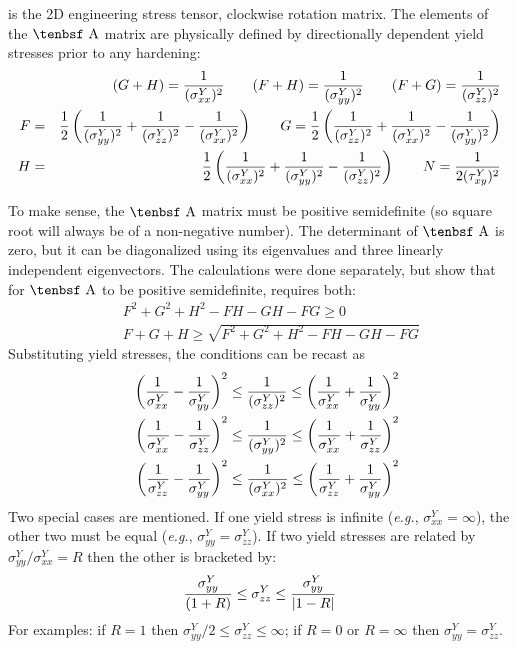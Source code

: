 \documentclass[11pt]{article}
\def\A{\hbox{\tenbsf A}}
\def\s#1{\sigma_{#1}}
\def\t#1{\tau_{#1}}
\begin{document}
is the 2D engineering stress tensor, clockwise rotation matrix. The elements of the $\A$ matrix are physically defined by directionally dependent yield stresses prior to any hardening:
\begin{eqnarray}
       &&(G+H)  =  {1\over (\s{xx}^Y)^2}   \qquad
       (F+H)  =  {1\over (\s{yy}^Y)^2}  \qquad
       (F+G)  =  {1\over (\s{zz}^Y)^2} \\
        F & = & {1\over 2}\left( {1\over (\s{yy}^Y)^2} + {1\over (\s{zz}^Y)^2} - {1\over (\s{xx}^Y)^2}\right) \qquad
       G = {1\over 2}\left( {1\over (\s{zz}^Y)^2} + {1\over (\s{xx}^Y)^2} - {1\over (\s{yy}^Y)^2}\right) \\
       H & = & {1\over 2}\left( {1\over (\s{xx}^Y)^2} + {1\over (\s{yy}^Y)^2} - {1\over (\s{zz}^Y)^2}\right) \qquad
       N = {1\over 2(\t{xy}^Y)^2}
\end{eqnarray}

To make sense, the $\A$ matrix must be positive semidefinite (so square root will always be of a non-negative number). The determinant of $\A$ is zero, but it can be diagonalized using its eigenvalues and three linearly independent eigenvectors. The calculations were done separately, but show that for $\A$ to be positive semidefinite, requires both:
\begin{eqnarray}
        &&F^2+G^2+H^2-FH-GH-FG \ge 0 \\
        &&F+G+H \ge \sqrt{F^2+G^2+H^2-FH-GH-FG}
\end{eqnarray}
Substituting yield stresses, the conditions can be recast as
\begin{eqnarray}
    && \left({1\over \s{xx}^Y}- {1\over \s{yy}^Y}\right)^2 \le {1\over (\s{zz}^Y)^2} \le \left({1\over \s{xx}^Y}+ {1\over \s{yy}^Y}\right)^2 \\
    && \left({1\over \s{xx}^Y}- {1\over \s{zz}^Y}\right)^2 \le {1\over (\s{yy}^Y)^2} \le \left({1\over \s{xx}^Y}+ {1\over \s{zz}^Y}\right)^2 \\
    && \left({1\over \s{zz}^Y}- {1\over \s{yy}^Y}\right)^2 \le {1\over (\s{xx}^Y)^2} \le \left({1\over \s{zz}^Y}+ {1\over \s{yy}^Y}\right)^2 
\end{eqnarray}
Two special cases are mentioned. If one yield stress is infinite ({\em e.g.}, $\s{xx}^Y=\infty$), the other two must be equal ({\em e.g.}, $\s{yy}^Y=\s{zz}^Y$).  If two yield stresses are related by $\s{yy}^Y/\s{xx}^Y=R$ then the other is bracketed by:
\begin{equation}
         { \s{yy}^Y \over (1+R)} \le   \s{zz}^Y   \le { \s{yy}^Y \over |1-R|} 
\end{equation}
For examples: if $R=1$ then $ \s{yy}^Y/2 \le \s{zz}^Y \le \infty$; if $R=0$ or $R=\infty$ then $ \s{yy}^Y= \s{zz}^Y$.
\end{document}
